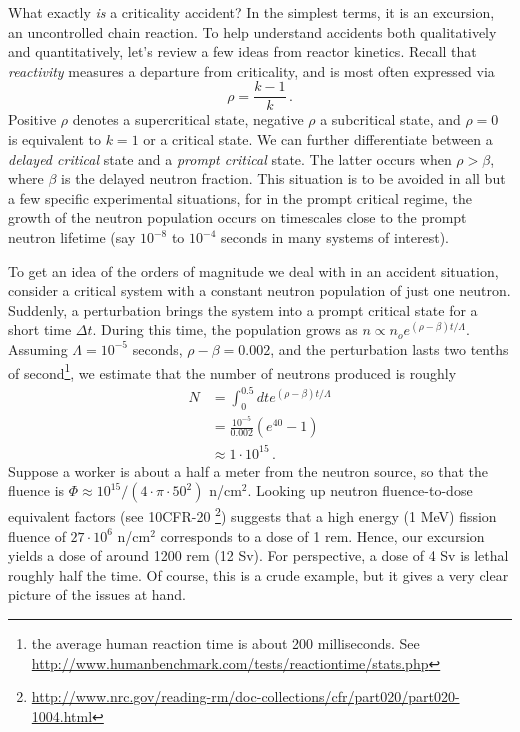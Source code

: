 What exactly \textit{is} a criticality accident?  In the simplest terms,
it is an excursion, an uncontrolled chain reaction.  To help understand
accidents
both qualitatively and quantitatively, let's review a few ideas from
reactor kinetics.  Recall that \textit{reactivity} measures a departure
from criticality, and is most often expressed via
\begin{equation}
 \rho = \frac{k-1}{k} \, .
\end{equation}
Positive $\rho$ denotes a supercritical state, negative $\rho$ a 
subcritical state, and $\rho = 0$ is equivalent to $k=1$ or a 
critical state.  We can further differentiate between a \textit{delayed
critical} state and a \textit{prompt critical} state.  The latter 
occurs when $\rho > \beta$, where $\beta$ is the delayed neutron
fraction.  This situation is to be avoided in all but a few specific
experimental situations, for in the prompt critical regime, 
the growth of the neutron population occurs on timescales close
to the prompt neutron lifetime (say $10^{-8}$ to $10^{-4}$ seconds in many
systems of interest).  

To get an idea of the orders of magnitude we deal with in an accident
situation, consider a critical system with a constant neutron population
of just one neutron.  Suddenly, a perturbation brings the system
into a prompt critical state for a short time $\Delta t$.  During this
time, the population grows as $n \propto n_o e^{(\rho-\beta)t/\Lambda}$.  
Assuming $\Lambda = 10^{-5}$ seconds, $\rho-\beta = 0.002$, and the perturbation 
lasts two tenths of second\footnote{the average human reaction time is
about 200 milliseconds. 
See \url{http://www.humanbenchmark.com/tests/reactiontime/stats.php}}, 
we estimate that the number of neutrons produced is 
roughly
\begin{equation}
\begin{split}
 N &= \int^{0.5}_0 dt e^{(\rho-\beta)t/\Lambda} \\
   &= \frac{10^{-5}}{0.002} (e^{40} - 1) \\
   &\approx 1 \cdot 10^{15} \, .
\end{split}
\end{equation}
Suppose a worker is about a half a meter from the neutron source, so that
the fluence is $\Phi \approx 10^{15} / (4\cdot \pi \cdot 50^2)$ n/cm$^2$.
Looking up neutron fluence-to-dose equivalent factors (see 10CFR-20
\footnote{\url{http://www.nrc.gov/reading-rm/doc-collections/cfr/part020/part020-1004.html}}) 
suggests
that a high energy (1 MeV) fission fluence of $27\cdot 10^6$  n/cm$^2$
corresponds
to a dose of 1 rem.  Hence, our excursion yields a dose of around
1200 rem (12 Sv).  For perspective, a dose of 4 Sv is lethal roughly 
half the time.  Of course, this is a crude example, but it gives a 
very clear picture of the issues at hand.

